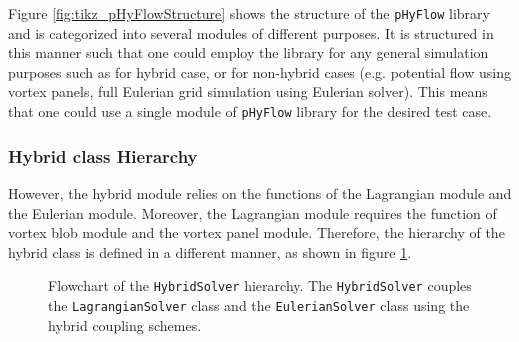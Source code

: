 Figure \ref{fig:tikz_pHyFlowStructure} shows the structure of the \texttt{pHyFlow} library and is categorized into several modules of different purposes. It is structured in this manner such that one could employ the library for any general simulation purposes such as for hybrid case, or for non-hybrid cases (e.g. potential flow using vortex panels, full Eulerian grid simulation using Eulerian solver). This means that one could use a single module of \texttt{pHyFlow} library for the desired test case.

\subsubsection{Hybrid class Hierarchy}

However, the hybrid module relies on the functions of the Lagrangian module and the Eulerian module. Moreover, the Lagrangian module requires the function of vortex blob module and the vortex panel module. Therefore, the hierarchy of the hybrid class is defined in a different manner, as shown in figure \ref{fig:tikz_hybridStructure}. 

\begin{figure}[h]
\centering
{}
\caption{Flowchart of the \texttt{HybridSolver} hierarchy. The \texttt{HybridSolver} couples the \texttt{LagrangianSolver} class and the \texttt{EulerianSolver} class using the hybrid coupling schemes.}
\label{fig:tikz_hybridStructure}
\end{figure}

